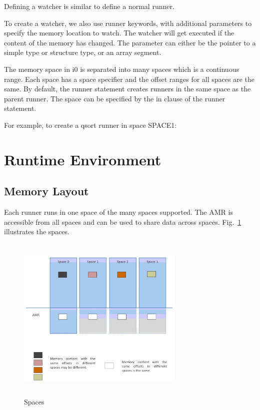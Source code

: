 \documentclass[a4paper]{article}
\DeclareRobustCommand{\mybox}[2][gray!20]{%
\begin{tcolorbox}[   %
        breakable,
        left=0pt,
        right=0pt,
        top=0pt,
        bottom=0pt,
        colback=#1,
        colframe=#1,
        width=\dimexpr\textwidth\relax, 
        enlarge left by=0mm,
        boxsep=5pt,
        arc=0pt,outer arc=0pt,
        ]
        #2
\end{tcolorbox}
}
\begin{document}
Defining a watcher is similar to define a normal runner.

To create a watcher, we also use runner keywords, with additional parameters to specify the memory location to watch. The watcher will get executed if the content of the memory has changed. The parameter can either be the pointer to a simple type or structure type, or an array segment.

{\mybox[gray!20]{{}}}

{}

The memory space in i0 is separated into many spaces which is a continuous range. Each space has a space specifier and the offset ranges for all spaces are the same. By default, the runner statement creates runners in the same space as the parent runner. The space can be specified by the in clause of the runner statement.

For example, to create a qsort runner in space SPACE1:

\mybox[gray!20]
{\color{blue}{}}

{\color{darkblue}\section{Runtime Environment}}

{\color{lightblue}\subsection{Memory Layout}}

Each runner runs in one space of the many spaces supported. The AMR is accessible from all spaces and can be used to share data across spaces. Fig.~\ref{fig:c0-spaces} illustrates the spaces.

\begin{figure}[htbp]
\begin{center}
  \includegraphics[width=8cm, height=8cm]{figure/spaces.eps}
  \caption{Spaces}
  \label{fig:c0-spaces}
\end{center}
\end{figure}
\end{document}
